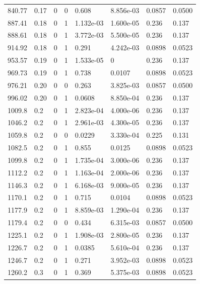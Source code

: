 \documentclass[preview]{standalone}
\begin{document}
{{{\begin{tabular}{L{1.2cm}C{1.2cm} C{0.3cm}C{0.5cm} C{1.4cm}C{1.4cm} C{1.4cm}C{1.4cm}}
  840.77  &  0.17  & 0     &  0 &  0.608  & 8.856e-03  & 0.0857 &  0.0500   \\ 
  887.41  &  0.18  & 0     &  1 &  1.132e-03  & 1.600e-05  & 0.236 &  0.137   \\ 
  888.61  &  0.18  & 0     &  1 &  3.772e-03  & 5.500e-05  & 0.236 &  0.137   \\ 
  914.92  &  0.18  & 0     &  1 &  0.291  & 4.242e-03  & 0.0898 &  0.0523   \\ 
  953.57  &  0.19  & 0     &  1 &  1.533e-05  & 0  & 0.236 &  0.137   \\ 
  969.73  &  0.19  & 0     &  1 &  0.738  & 0.0107  & 0.0898 &  0.0523   \\ 
  976.21  &  0.20  & 0     &  0 &  0.263  & 3.825e-03  & 0.0857 &  0.0500   \\ 
  996.02  &  0.20  & 0     &  1 &  0.0608  & 8.850e-04  & 0.236 &  0.137   \\ 
  1009.8  &   0.2  & 0     &  1 &  2.823e-04  & 4.000e-06  & 0.236 &  0.137   \\ 
  1046.2  &   0.2  & 0     &  1 &  2.961e-03  & 4.300e-05  & 0.236 &  0.137   \\ 
  1059.8  &   0.2  & 0     &  0 &  0.0229  & 3.330e-04  & 0.225 &  0.131   \\ 
  1082.5  &   0.2  & 0     &  1 &  0.855  & 0.0125  & 0.0898 &  0.0523   \\ 
  1099.8  &   0.2  & 0     &  1 &  1.735e-04  & 3.000e-06  & 0.236 &  0.137   \\ 
  1112.2  &   0.2  & 0     &  1 &  1.163e-04  & 2.000e-06  & 0.236 &  0.137   \\ 
  1146.3  &   0.2  & 0     &  1 &  6.168e-03  & 9.000e-05  & 0.236 &  0.137   \\ 
  1170.1  &   0.2  & 0     &  1 &  0.715  & 0.0104  & 0.0898 &  0.0523   \\ 
  1177.9  &   0.2  & 0     &  1 &  8.859e-03  & 1.290e-04  & 0.236 &  0.137   \\ 
  1179.4  &   0.2  & 0     &  0 &  0.434  & 6.315e-03  & 0.0857 &  0.0500   \\ 
  1225.1  &   0.2  & 0     &  1 &  1.908e-03  & 2.800e-05  & 0.236 &  0.137   \\ 
  1226.7  &   0.2  & 0     &  1 &  0.0385  & 5.610e-04  & 0.236 &  0.137   \\ 
  1246.7  &   0.2  & 0     &  1 &  0.271  & 3.952e-03  & 0.0898 &  0.0523   \\ 
  1260.2  &   0.3  & 0     &  1 &  0.369  & 5.375e-03  & 0.0898 &  0.0523   \\ 

\end{tabular}}}}
\end{document}
